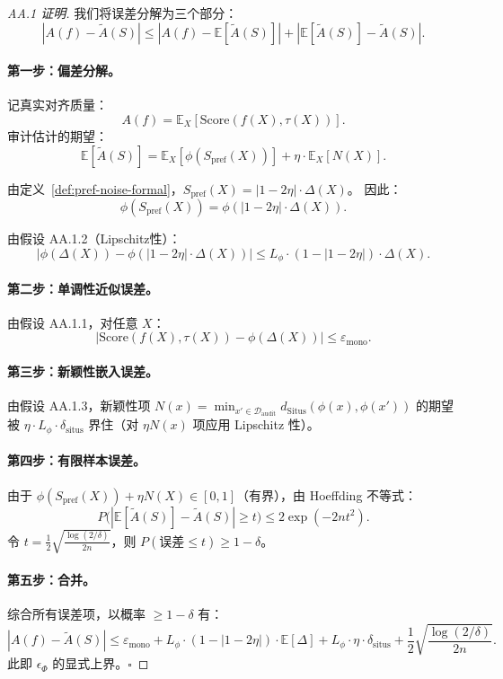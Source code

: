 \documentclass[12pt,a4paper]{article}
\newcommand{\E}{\mathbb{E}}
\newcommand{\cD}{\mathcal{D}}
\newcommand{\Situs}{\mathrm{Situs}}
\begin{document}
\begin{proof}[AA.1 证明]
我们将误差分解为三个部分：
\[
|A(f) - \tilde{A}(S)| \leq |A(f) - \E[\tilde{A}(S)]| + |\E[\tilde{A}(S)] - \tilde{A}(S)|.
\]

\paragraph{第一步：偏差分解。}
记真实对齐质量：
\[
A(f) = \E_X[\mathrm{Score}(f(X), \tau(X))].
\]
审计估计的期望：
\[
\E[\tilde{A}(S)] = \E_X[\phi(S_{\mathrm{pref}}(X))] + \eta\cdot\E_X[N(X)].
\]

由定义~\ref{def:pref-noise-formal}，$S_{\mathrm{pref}}(X) = |1-2\eta|\cdot\Delta(X)$。
因此：
\[
\phi(S_{\mathrm{pref}}(X)) = \phi(|1-2\eta|\cdot\Delta(X)).
\]

由假设 AA.1.2（Lipschitz性）：
\[
|\phi(\Delta(X)) - \phi(|1-2\eta|\cdot\Delta(X))| \leq L_\phi \cdot (1 - |1-2\eta|) \cdot \Delta(X).
\]

\paragraph{第二步：单调性近似误差。}
由假设 AA.1.1，对任意 $X$：
\[
|\mathrm{Score}(f(X),\tau(X)) - \phi(\Delta(X))| \leq \varepsilon_{\mathrm{mono}}.
\]

\paragraph{第三步：新颖性嵌入误差。}
由假设 AA.1.3，新颖性项 $N(x) = \min_{x'\in\cD_{\mathrm{audit}}} d_{\Situs}(\phi(x),\phi(x'))$
的期望被 $\eta\cdot L_\phi \cdot \delta_{\mathrm{situs}}$ 界住（对 $\eta N(x)$ 项应用 Lipschitz 性）。

\paragraph{第四步：有限样本误差。}
由于 $\phi(S_{\mathrm{pref}}(X)) + \eta N(X) \in [0, 1]$（有界），由 Hoeffding 不等式：
\[
P\bigl(|\E[\tilde{A}(S)] - \tilde{A}(S)| \geq t\bigr) \leq 2\exp(-2nt^2).
\]
令 $t = \frac12\sqrt{\frac{\log(2/\delta)}{2n}}$，则 $P(\text{误差}\leq t) \geq 1-\delta$。

\paragraph{第五步：合并。}
综合所有误差项，以概率 $\geq 1-\delta$ 有：
\[
|A(f) - \tilde{A}(S)| \leq \varepsilon_{\mathrm{mono}} + L_\phi\!\cdot\!(1-|1-2\eta|)\!\cdot\!\E[\Delta] + L_\phi\!\cdot\!\eta\!\cdot\!\delta_{\mathrm{situs}} + \frac12\sqrt{\frac{\log(2/\delta)}{2n}}.
\]
此即 $\epsilon_\Phi$ 的显式上界。\hfill$\square$
\end{proof}
\end{document}
